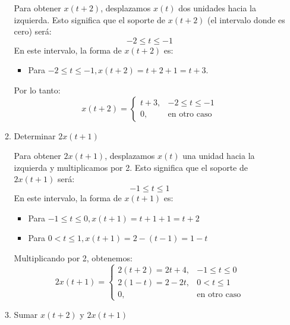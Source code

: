 \begin{enumerate}[label=\color{red}\textbf{\arabic*)}]
\begin{enumerate}[label=Paso \arabic*:]
    Para obtener  $x(t+2)$, desplazamos  $x(t)$ dos unidades hacia la izquierda. Esto significa que el soporte de  $x(t+2)$ (el intervalo donde es cero) será:  \[
    -2\le t\le -1
    \] 
    En este intervalo, la forma de $x(t+2)$ es: 
    \begin{itemize}[label=\textbullet]
      \item Para $-2\le t\le -1,x(t+2)=t+2+1=t+3$.
    \end{itemize}
    Por lo tanto: \[
    x(t+2)=\begin{cases}
      t+3, & -2\le t\le -1\\
      0, & \text{en otro caso}
    \end{cases}
    \] 
  \item Determinar $2x(t+1)$

    Para obtener  $2x(t+1)$, desplazamos  $x(t)$ una unidad hacia la izquierda y multiplicamos por 2. Esto significa que el soporte de  $2x(t+1)$ será:  \[
    -1\le t\le 1
    \] 
    En este intervalo, la forma de $x(t+1)$ es:
     \begin{itemize}[label=\textbullet]
      \item Para $-1\le t\le 0,x(t+1)=t+1+1=t+2$
      \item Para $0<t\le 1,x(t+1)=2-(t-1)=1-t$
    \end{itemize}
    Multiplicando por 2, obtenemos: \[
    2x(t+1)=\begin{cases}
      2(t+2)=2t+4, & -1\le t\le 0\\
      2(1-t)=2-2t, & 0<t\le 1\\
      0, & \text{en otro caso}
    \end{cases}
    \] 
  \item Sumar $x(t+2)$ y  $2x(t+1)$


\end{enumerate}
\end{enumerate}
